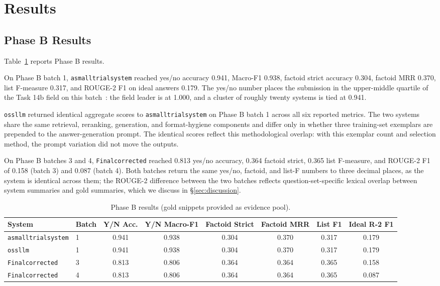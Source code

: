 \documentclass[sigconf,natbib=true]{ceurart}
\begin{document}
\section{Results}
\label{sec:results}

\subsection{Phase B Results}

Table~\ref{tab:phaseB} reports Phase B results.

On Phase B batch 1, \texttt{asmalltrialsystem} reached yes/no accuracy 0.941, Macro-F1 0.938, factoid strict accuracy 0.304, factoid MRR 0.370, list F-measure 0.317, and ROUGE-2 F1 on ideal answers 0.179. The yes/no number places the submission in the upper-middle quartile of the Task 14b field on this batch~\cite{nentidis2026bioasq}: the field leader is at 1.000, and a cluster of roughly twenty systems is tied at 0.941.

\texttt{ossllm} returned identical aggregate scores to \texttt{asmalltrialsystem} on Phase B batch 1 across all six reported metrics. The two systems share the same retrieval, reranking, generation, and format-hygiene components and differ only in whether three training-set exemplars are prepended to the answer-generation prompt. The identical scores reflect this methodological overlap: with this exemplar count and selection method, the prompt variation did not move the outputs.

On Phase B batches 3 and 4, \texttt{Finalcorrected} reached 0.813 yes/no accuracy, 0.364 factoid strict, 0.365 list F-measure, and ROUGE-2 F1 of 0.158 (batch 3) and 0.087 (batch 4). Both batches return the same yes/no, factoid, and list-F numbers to three decimal places, as the system is identical across them; the ROUGE-2 difference between the two batches reflects question-set-specific lexical overlap between system summaries and gold summaries, which we discuss in \S\ref{sec:discussion}.

\begin{table}[t]
\centering
\small
\begin{tabular}{llcccccc}
\toprule
\textbf{System} & \textbf{Batch} & \textbf{Y/N Acc.} & \textbf{Y/N Macro-F1} & \textbf{Factoid Strict} & \textbf{Factoid MRR} & \textbf{List F1} & \textbf{Ideal R-2 F1} \\
\midrule
\texttt{asmalltrialsystem} & 1 & 0.941 & 0.938 & 0.304 & 0.370 & 0.317 & 0.179 \\
\texttt{ossllm}            & 1 & 0.941 & 0.938 & 0.304 & 0.370 & 0.317 & 0.179 \\
\texttt{Finalcorrected}    & 3 & 0.813 & 0.806 & 0.364 & 0.364 & 0.365 & 0.158 \\
\texttt{Finalcorrected}    & 4 & 0.813 & 0.806 & 0.364 & 0.364 & 0.365 & 0.087 \\
\bottomrule
\end{tabular}
\caption{Phase B results (gold snippets provided as evidence pool).}
\label{tab:phaseB}
\end{table}
\end{document}

